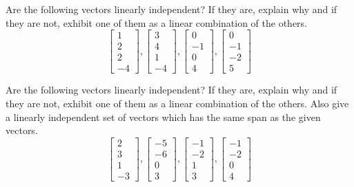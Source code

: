 \documentclass{ximera}
\begin{document}
\begin{problem}\label{prb:3.23} Are the following vectors linearly independent? If they are, explain
why and if they are not, exhibit one of them as a linear combination of the
others.
\begin{equation*}
\left[
\begin{array}{r}
1 \\
2 \\
2 \\
-4
\end{array}
\right] ,\left[
\begin{array}{r}
3 \\
4 \\
1 \\
-4
\end{array}
\right] ,\left[
\begin{array}{r}
0 \\
-1 \\
0 \\
4
\end{array}
\right] ,\left[
\begin{array}{r}
0 \\
-1 \\
-2 \\
5
\end{array}
\right]
\end{equation*}
\end{problem}

\begin{problem}\label{prb:3.24} Are the following vectors linearly independent? If they are, explain
why and if they are not, exhibit one of them as a linear combination of the
others. Also give a linearly independent set of vectors which has the same
span as the given vectors.
\begin{equation*}
\left[
\begin{array}{r}
2 \\
3 \\
1 \\
-3
\end{array}
\right] ,\left[
\begin{array}{r}
-5 \\
-6 \\
0 \\
3
\end{array}
\right] ,\left[
\begin{array}{r}
-1 \\
-2 \\
1 \\
3
\end{array}
\right] ,\left[
\begin{array}{r}
-1 \\
-2 \\
0 \\
4
\end{array}
\right]
\end{equation*}
\end{problem}
\end{document}

